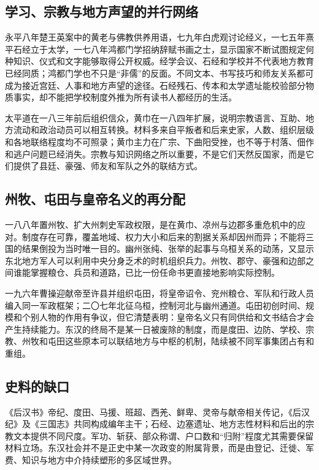 \subsection{学习、宗教与地方声望的并行网络}

永平八年楚王英案中的黄老与佛教供养用语，七九年白虎观讨论经义，一七五年熹平石经立于太学，一七八年鸿都门学招纳辞赋书画之士，显示国家不断试图规定何种知识、仪式和文字能够取得公开权威。经学会议、石经和学校并不代表地方教育已经同质；鸿都门学也不只是“非儒”的反面。不同文本、书写技巧和师友关系都可成为接近宫廷、人事和地方声望的途径。石经残石、传本和太学遗址能校验部分物质事实，却不能把学校制度外推为所有读书人都经历的生活。

太平道在一八三年前后组织信众，黄巾在一八四年扩展，说明宗教语言、互助、地方流动和政治动员可以相互转换。材料多来自平叛者和后来史家，人数、组织层级和各地联络程度均不可照录；黄巾主力在广宗、下曲阳受挫，也不等于村落、佃作和逃户问题已经消失。宗教与知识网络之所以重要，不是它们天然反国家，而是它们提供了县廷、豪强、师友和军队之外的联结方式。

\subsection{州牧、屯田与皇帝名义的再分配}

一八八年置州牧、扩大州刺史军政权限，是在黄巾、凉州与边郡多重危机中的应对。制度存在可靠，覆盖地域、权力大小和后来的割据关系却因州而异；不能将三国的结果倒投为当时唯一目的。幽州张纯、张举的起事与乌桓关系的动荡，又显示东北地方军人可以利用中央分身乏术的时机组织兵力。州牧、郡守、豪强和边部之间谁能掌握粮仓、兵员和道路，已比一份任命书更直接地影响实际控制。

一九六年曹操迎献帝至许县并组织屯田，将皇帝诏令、兖州粮仓、军队和行政人员编入同一军政框架；二〇七年北征乌桓，控制河北与幽州通道。屯田初创时间、规模和个别人物的作用有争议，但它清楚表明：皇帝名义只有同供给和文书结合才会产生持续能力。东汉的终局不是某一日被废除的制度，而是度田、边防、学校、宗教、州牧和屯田这些原本可以联结地方与中枢的机制，陆续被不同军事集团占有和重组。

\subsection{史料的缺口}

《后汉书》帝纪、度田、马援、班超、西羌、鲜卑、灵帝与献帝相关传记，《后汉纪》及《三国志》共同构成编年主干；石经、边塞遗址、地方志性材料和后出的宗教文本提供不同尺度。军功、斩获、部众称谓、户口数和“归附”程度尤其需要保留材料立场。东汉社会并不是正史中某一次政变的附属背景，而是由登记、迁徙、军费、知识与地方中介持续塑形的多区域世界。
